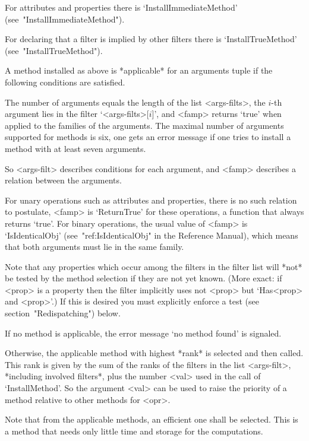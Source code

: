 For attributes and properties there is `InstallImmediateMethod' 
(see~"InstallImmediateMethod").

For declaring that a filter is implied by other filters there is
`InstallTrueMethod' (see~"InstallTrueMethod").


A method installed as above is *applicable* for an arguments tuple
if the following conditions are satisfied.

The number of arguments equals the length of the list <args-filts>,
the $i$-th argument lies in the filter `<args-filts>[$i$]',
and <famp> returns `true' when applied to the families of the arguments.
The maximal number of arguments supported for methods is six,
one gets an error message if one tries to install a method with at least
seven arguments.

So <args-filt> describes conditions for each argument,
and <famp> describes a relation between the arguments.

For unary operations such as attributes and properties,
there is no such relation to postulate,
<famp> is `ReturnTrue' for these operations,
a function that always returns `true'.
For binary operations, the usual value of <famp> is `IsIdenticalObj'
(see~"ref:IsIdenticalObj" in the Reference Manual),
which means that both arguments must lie in the same family.

Note that any properties which occur among the filters in the filter list
will *not* be tested by the method selection if they are not yet known.
(More exact: if <prop> is a property then the filter implicitly uses not
<prop> but `Has<prop> and <prop>'.) If this is desired you must explicitly
enforce a test (see section~"Redispatching") below.

If no method is applicable,
the error message `no method found' is signaled.

Otherwise, the applicable method with highest *rank* is selected and then
called.
This rank is given by the sum of the ranks of the filters in the list
<args-filt>,
*including involved filters*,
plus the number <val> used in the call of `InstallMethod'.
So the argument <val> can be used to raise the priority of a method
relative to other methods for <opr>.

Note that from the applicable methods,
an efficient one shall be selected.
This is a method that needs only little time and storage for the
computations.


